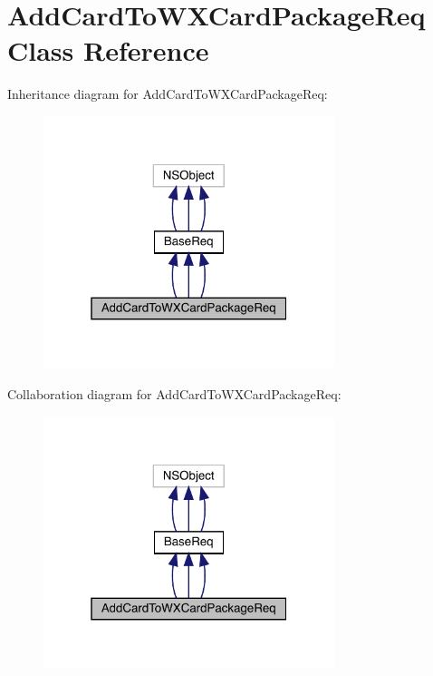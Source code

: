 \hypertarget{interface_add_card_to_w_x_card_package_req}{}\section{Add\+Card\+To\+W\+X\+Card\+Package\+Req Class Reference}
\label{interface_add_card_to_w_x_card_package_req}


Inheritance diagram for Add\+Card\+To\+W\+X\+Card\+Package\+Req\+:\nopagebreak
\begin{figure}[H]
\begin{center}
\leavevmode
\includegraphics[width=241pt]{interface_add_card_to_w_x_card_package_req__inherit__graph}
\end{center}
\end{figure}


Collaboration diagram for Add\+Card\+To\+W\+X\+Card\+Package\+Req\+:\nopagebreak
\begin{figure}[H]
\begin{center}
\leavevmode
\includegraphics[width=241pt]{interface_add_card_to_w_x_card_package_req__coll__graph}
\end{center}
\end{figure}
